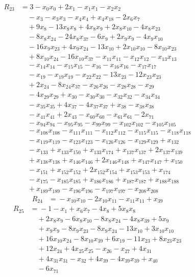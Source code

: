 \begin{align*}
R_{23}&={}3 -x_{0}x_{0} +2x_{1} -x_{1}x_{1} -x_{2}x_{2}\\
&\quad{}-x_{3} -x_{3}x_{3} -x_{4}x_{4} +x_{4}x_{18} -2x_{6}x_{7}\\
&\quad{}+9x_{8} -13x_{8}x_{8} +4x_{8}x_{9} +2x_{8}x_{10} -4x_{8}x_{23}\\
&\quad{}-8x_{8}x_{24} -24x_{8}x_{37} -6x_{9} +2x_{9}x_{9} -4x_{9}x_{10}\\
&\quad{}-16x_{9}x_{23} +4x_{9}x_{24} -13x_{10} +2x_{10}x_{10} -8x_{10}x_{23}\\
&\quad{}+8x_{10}x_{24} -16x_{10}x_{37} -x_{11}x_{11} -x_{12}x_{12} -x_{13}x_{13}\\
&\quad{}-x_{14}x_{14} -x_{15}x_{15} -x_{16} -x_{16}x_{16} -x_{17}x_{17}\\
&\quad{}-x_{19} -x_{19}x_{19} -x_{22}x_{22} -13x_{23} -12x_{23}x_{23}\\
&\quad{}+2x_{24} -8x_{24}x_{37} -x_{26}x_{26} -x_{28}x_{28} -x_{29}\\
&\quad{}-4x_{29}x_{29} +x_{30} -x_{30}x_{30} -x_{32}x_{32} -x_{34}x_{34}\\
&\quad{}-x_{35}x_{35} +4x_{37} -4x_{37}x_{37} +x_{38} -x_{38}x_{38}\\
&\quad{}-x_{41}x_{41} +2x_{43} -x_{60}x_{60} -x_{61}x_{61} -2x_{71}\\
&\quad{}-x_{94}x_{94} -x_{95}x_{95} -x_{99}x_{99} -x_{102}x_{102} -x_{105}x_{105}\\
&\quad{}-x_{108}x_{108} -x_{111}x_{111} -x_{112}x_{112} -x_{115}x_{115} -x_{118}x_{118}\\
&\quad{}-x_{119}x_{119} -x_{123}x_{123} -x_{126}x_{126} -x_{129}x_{129} +x_{132}\\
&\quad{}-x_{133} +x_{133}x_{150} +x_{133}x_{174} +x_{137}x_{137} +2x_{137}x_{139}\\
&\quad{}+x_{138}x_{138} +x_{146}x_{146} +2x_{146}x_{148} +x_{147}x_{147} +x_{150}\\
&\quad{}-x_{151} +x_{152}x_{152} +2x_{152}x_{154} +x_{153}x_{153} +x_{174}\\
&\quad{}-x_{175} -x_{185}x_{185} +x_{186}x_{186} +x_{187}x_{187} +x_{188}x_{188}\\
&\quad{}+x_{189}x_{189} -x_{196}x_{196} -x_{197}x_{197} -x_{208}x_{208}
\end{align*}
\begin{align*}
R_{24}&={}-x_{10}x_{10} -2x_{10}x_{11} -x_{11}x_{11} +x_{39}
\end{align*}
\begin{align*}
R_{25}&={}-1 -x_{1} +x_{6}x_{7} -4x_{8} +5x_{8}x_{8}\\
&\quad{}+2x_{8}x_{9} -6x_{8}x_{10} -8x_{8}x_{24} -4x_{8}x_{39} +5x_{9}\\
&\quad{}+x_{9}x_{9} -8x_{9}x_{23} -8x_{9}x_{24} -13x_{10} +3x_{10}x_{10}\\
&\quad{}+16x_{10}x_{24} -8x_{10}x_{39} +6x_{19} -11x_{23} +8x_{23}x_{23}\\
&\quad{}+12x_{24} +4x_{25}x_{25} -x_{26} -x_{27} +4x_{31}\\
&\quad{}+4x_{31}x_{31} -x_{32} +4x_{39} -4x_{39}x_{39} +x_{40}\\
&\quad{}-6x_{71}
\end{align*}
